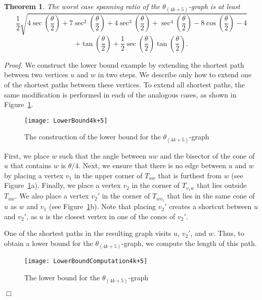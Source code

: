 \documentclass[12pt]{article}
\newtheorem{theo}[defin]{Theorem}
\newenvironment{theorem}{\begin{theo} \sl}{\end{theo}}
\newenvironment{proof}{\emph{Proof.}}{\hfill $\Box$\\}
\newcommand{\graph}[1]{\ensuremath{\theta_{(4 k + #1)}}-graph\xspace}
\newcommand{\canon}[2]{\ensuremath{T_{#1 #2}}}
\begin{document}
\begin{theorem}
  The worst case spanning ratio of the \graph{5} is at least \[ \frac{1}{2} \sqrt{4\sec\left(\frac{\theta}{2}\right) + 7\sec^2\left(\frac{\theta}{2}\right) + 4\sec^3\left(\frac{\theta}{2}\right) + \sec^4\left(\frac{\theta}{2}\right) - 8\cos\left(\frac{\theta}{2}\right) - 4}\] \[+ \tan\left(\frac{\theta}{2}\right) + \frac{1}{2}\sec\left(\frac{\theta}{2}\right)\tan\left(\frac{\theta}{2}\right).\]
\end{theorem}
\begin{proof}
We construct the lower bound example by extending the shortest path between two vertices $u$ and $w$ in two steps. We describe only how to extend one of the shortest paths between these vertices. To extend all shortest paths, the same modification is performed in each of the analogous cases, as shown in Figure~\ref{fig:LowerBound4k+5}. 

\begin{figure}[ht]
  \begin{center}
    \texttt{[image: LowerBound4k+5]}
  \end{center}
  \caption{The construction of the lower bound for the \graph{5}}
  \label{fig:LowerBound4k+5}
\end{figure}

First, we place $w$ such that the angle between $u w$ and the bisector of the cone of $u$ that contains $w$ is $\theta/4$. Next, we ensure that there is no edge between $u$ and $w$ by placing a vertex $v_1$ in the upper corner of \canon{u}{w} that is furthest from $w$ (see Figure~\ref{fig:LowerBound4k+5}a). Finally, we place a vertex $v_2$ in the corner of \canon{v_1}{w} that lies outside \canon{u}{w}. We also place a vertex $v_2'$ in the corner of \canon{w}{v_1} that lies in the same cone of $u$ as $w$ and $v_1$ (see Figure~\ref{fig:LowerBound4k+5}b). Note that placing $v_2'$ creates a shortcut between $u$ and $v_2'$, as $u$ is the closest vertex in one of the cones of $v_2'$. 

One of the shortest paths in the resulting graph visits $u$, $v_2'$, and $w$. Thus, to obtain a lower bound for the \graph{5}, we compute the length of this path. 

\begin{figure}[ht]
  \begin{center}
    \texttt{[image: LowerBoundComputation4k+5]}
  \end{center}
  \caption{The lower bound for the \graph{5}}
  \label{fig:LowerBoundComputation4k+5}
\end{figure}


\end{proof}
\end{document}
